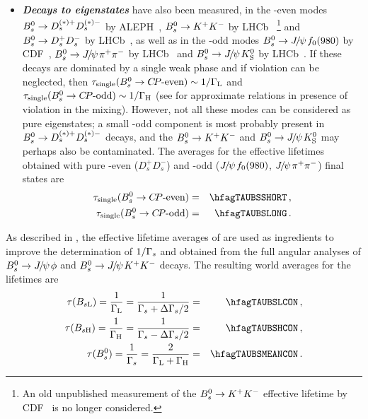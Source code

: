 \begin{itemize}
\item
{\bf\em Decays to \boldmath\CP eigenstates} have also 
been measured, in the \CP-even modes 
$B^0_s \to D_s^{(*)+}D_s^{(*)-}$ by ALEPH~\cite{Barate:2000kd},
$B^0_s \to K^+ K^-$ by LHCb~\cite{Aaij:2011kn,Aaij:2014fia,*Aaij:2012ns_cont}%
\footnote{An old unpublished measurement of the $B^0_s \to K^+ K^-$
effective lifetime by CDF~\cite{Tonelli:2006np} is no longer considered.}
and $B^0_s \to D_s^+D_s^-$ by LHCb~\cite{Aaij:2013bvd}, as well as in the \CP-odd modes 
$B^0_s \to {J\mskip -3mu/\mskip -2mu\psi\mskip 2mu} f_0(980)$ by CDF~\cite{Aaltonen:2011nk}, 
$B^0_s \to {J\mskip -3mu/\mskip -2mu\psi\mskip 2mu} \pi^+\pi^-$ by LHCb~\cite{Aaij:2013oba,*LHCb:2011aa_mod,*LHCb:2012ad_mod,*LHCb:2011ab_mod,*Aaij:2012nta_mod}
and $B^0_s \to {J\mskip -3mu/\mskip -2mu\psi\mskip 2mu} K^0_{\rm S}$ by LHCb~\cite{Aaij:2013eia}.
If these 
decays are dominated by a single weak phase and if \CP violation 
can be neglected, then $\tau_{\rm single}(\Bs \to \mbox{\CP-even}) \sim 1/\Gamma_{\rm L}$ 
and  $\tau_{\rm single}(\Bs \to \mbox{\CP-odd}) \sim 1/\Gamma_{\rm H}$ 
(see  for approximate relations in presence of
\CP violation in the mixing). 
However, not all these modes can be considered as pure \CP eigenstates; 
a small \CP-odd component is most probably present
in $B^0_s \to D_s^{(*)+}D_s^{(*)-}$ decays, and the $B^0_s \to K^+ K^-$
and $B^0_s \to {J\mskip -3mu/\mskip -2mu\psi\mskip 2mu} K^0_{\rm S}$ may perhaps also be contaminated. 
The averages for the effective lifetimes obtained with pure \CP-even 
($D_s^+D_s^-$) and \CP-odd (${J\mskip -3mu/\mskip -2mu\psi\mskip 2mu} f_0(980)$, ${J\mskip -3mu/\mskip -2mu\psi\mskip 2mu} \pi^+\pi^-$)
final states are
\begin{eqnarray}
\tau_{\rm single}(\Bs \to \mbox{\CP-even}) & = & \hfagTAUBSSHORT \,,
\labe{tau_KK}
\\
\tau_{\rm single}(\Bs \to \mbox{\CP-odd}) & = & \hfagTAUBSLONG \,.
\labe{tau_Jpsif0}
\end{eqnarray}

\end{itemize}

As described in , 
the effective lifetime averages of 
are used as ingredients to improve the 
determination of $1/\Gamma_{s}$ and \DGs obtained from the full angular analyses
of $B^0_s\to {J\mskip -3mu/\mskip -2mu\psi\mskip 2mu}\phi$ and $B^0_s\to {J\mskip -3mu/\mskip -2mu\psi\mskip 2mu} K^+K^-$ decays. 
The resulting world averages for the \Bs lifetimes are
\begin{eqnarray}
\tau(\B_{s\rm L}) =
\frac{1}{\Gamma_{\rm L}} = \frac{1}{\Gs+\DGs/2} & = & \hfagTAUBSLCON \,, \\
\tau(\B_{s\rm H}) =
\frac{1}{\Gamma_{\rm H}} = \frac{1}{\Gs-\DGs/2} & = & \hfagTAUBSHCON \,, \\
\tau(\Bs) = \frac{1}{\Gs} = \frac{2}{\Gamma_{\rm L}+\Gamma_{\rm H}} & = & \hfagTAUBSMEANCON \,.
\labe{oneoverGs}
\end{eqnarray}

